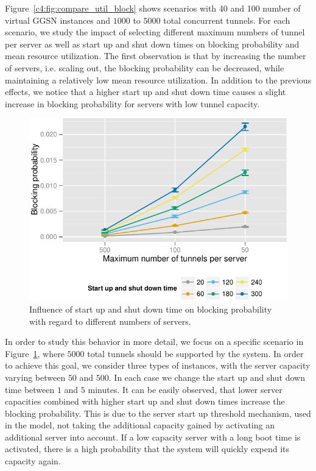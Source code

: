 Figure~\ref{c4:fig:compare_util_block} shows scenarios with 40 and 100 number of virtual \gls{GGSN} instances and  $1000$ to $5000$ total concurrent tunnels. For each scenario, we study the impact of selecting different maximum numbers of tunnel per server as well as start up and shut down times on blocking probability and mean resource utilization. The first observation is that by increasing the number of servers, i.e. scaling out, the blocking probability can be decreased, while maintaining a relatively low mean resource utilization. In addition to the previous effects, we notice that a higher start up and shut down time causes a slight increase in blocking probability for servers with low tunnel capacity.

\begin{figure}[htb]
  \centering
  \includegraphics{images/compare-maxinstances-block.pdf}
  \caption{Influence of start up and shut down time on blocking probability with regard to different numbers of servers.}
 \label{c4:fig:compare_maxinstances_block}
\end{figure}

In order to study this behavior in more detail, we focus on a specific scenario in Figure~\ref{c4:fig:compare_maxinstances_block}, where $5000$ total tunnels should be supported by the system. In order to achieve this goal, we consider three types of instances, with the server capacity varying between $50$ and $500$.  In each case we change the start up and shut down time between $1$ and $5$ minutes. It can be easily observed, that lower server capacities combined with higher start up and shut down times increase the blocking probability. This is due to the server start up threshold mechanism, used in the model, not taking the additional capacity gained by activating an additional server into account. If a low capacity server with a long boot time is activated, there is a high probability that the system will quickly expend its capacity again.

